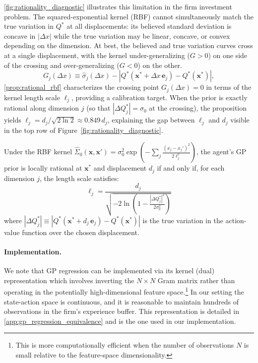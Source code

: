 \ref{fig:rationality_diagnostic} illustrates this limitation in the firm 
investment problem. The squared-exponential kernel (RBF) cannot simultaneously match 
the true variation in $Q^*$ at all displacements: its believed standard deviation 
is concave in $|\Delta x|$ while the true variation may be linear, concave, or 
convex depending on the dimension. At best, the believed and true variation 
curves cross at a single displacement, with the kernel under-generalizing 
($G > 0$) on one side of the crossing and over-generalizing ($G < 0$) on 
the other.
\begin{equation}
    G_j(\Delta x) \equiv \hat{\sigma}_j(\Delta x) 
    - \left| Q^*(\mathbf{x}^* + \Delta x\, \mathbf{e}_j) 
    - Q^*(\mathbf{x}^*) \right|,
\end{equation}
\ref{prop:rational_rbf} characterizes the crossing point $G_j(\Delta x) = 0$ in terms of the kernel length scale 
$\ell_j$, providing a calibration target. When the prior is exactly rational 
along dimension $j$ (so that $|\Delta Q^*_j| = \sigma_0$ at the crossing), the 
proposition yields $\ell_j = d_j / \sqrt{2 \ln 2} \approx 0.849\, d_j$, 
explaining the gap between $\ell_j$ and $d_j$ visible in the top row of 
Figure~\ref{fig:rationality_diagnostic}.

\begin{proposition}
\label{prop:rational_rbf}
Under the RBF kernel $\hat{\Sigma}_0(\mathbf{x}, \mathbf{x}') = \sigma_0^2 
\exp\left(-\sum_j \frac{(x_j - x_j')^2}{2\ell_j^2}\right)$, 
the agent's GP prior is locally rational at $\mathbf{x}^*$ and 
displacement $d_j$ if and only if, for each dimension $j$, the length 
scale satisfies:
\begin{equation}
    \ell_j = \frac{d_j}{\sqrt{-2\ln\left(1 - 
    \frac{|\Delta Q^*_j|^2}{2\sigma_0^2}\right)}}
\end{equation}
where $|\Delta Q^*_j| \equiv |Q^*(\mathbf{x}^* + d_j \, \mathbf{e}_j) 
- Q^*(\mathbf{x}^*)|$ is the true variation in the action-value function 
over the chosen displacement.
\end{proposition}

\paragraph{Implementation.} We note that GP regression can be implemented via its 
kernel (dual) representation which involves inverting the $N \times N$ Gram matrix rather than 
operating in the potentially high-dimensional feature space.\footnote{This is more 
computationally efficient when the number of observations $N$ is small relative to 
the feature-space dimensionality.} In our setting the state-action space is continuous, 
and it is reasonable to maintain hundreds of observations in the firm's experience buffer. 
This representation is detailed in \ref{app:gp_regression_equivalence} and is the one used in our
implementation.
